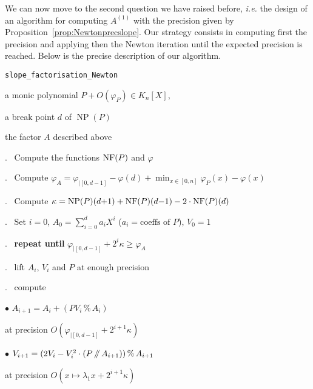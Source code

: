 \documentclass{sig-alternate-05-2015}
\DeclareMathOperator{\NP}{NP}
\newcommand{\NF}{\text{\rm NF}}
\renewcommand{\mod}{\,\%\,}
\renewcommand{\div}{\,/\hspace{-0.3em}/\,}
\begin{document}
We can now move to the second question we have raised before, 
\emph{i.e.} the design of an algorithm for computing $A^{(1)}$ with the 
precision given by Proposition~\ref{prop:Newtonprecslope}. Our strategy 
consists in computing first the precision and applying then the Newton 
iteration until the expected precision is reached. Below is the
precise description of our algorithm.

\noindent\hrulefill

 {\tt slope\_factorisation\_Newton}

 a monic polynomial $P + O(\varphi_P) \in K_n[X]$,

\noindent{}a break point $d$ of $\NP(P)$

 the factor $A$ described above

\smallskip{}.\ %
Compute the functions $\NF(P)$ and $\varphi$

\smallskip{}.\ %
Compute $\varphi_A = \varphi_{|[0,d-1]} - \varphi(d) + \min_{x \in [0,n]}
\varphi_P(x) - \varphi(x)$

\smallskip{}.\ %
Compute $\kappa = \NP(P)(d{+}1) + \NF(P)(d{-}1) - 2 \cdot \NF(P)(d)$

\smallskip{}.\ %
Set $i = 0$, $A_0 = \sum_{i=0}^d a_i X^i$
($a_i = \text{coeffs of } P$), $V_0 = 1$

\smallskip{}.\ %
{\bf repeat until} $\varphi_{|[0,d{-}1]} + 2^i \kappa \geq \varphi_A$

\smallskip{}.\ \hspace{5mm}%
lift $A_i$, $V_i$ and $P$ at enough precision

\smallskip{}.\ \hspace{5mm}%
compute 

\smallskip

\hspace{1cm}$\bullet$
$A_{i+1} = A_i + (P V_i \mod A_i)$

\hspace{1cm}\phantom{$\bullet$ }%
at precision $O(\varphi_{|[0,d{-}1]} + 2^{i+1} \kappa)$

\smallskip

\hspace{1cm}$\bullet$
$V_{i+1} = (2 V_i - V_i^2 \cdot (P \div A_{i+1})) \mod A_{i+1}$

\hspace{1cm}\phantom{$\bullet$ }%
at precision $O(x \mapsto \lambda_1 x + 2^{i+1}\kappa)$
\end{document}
